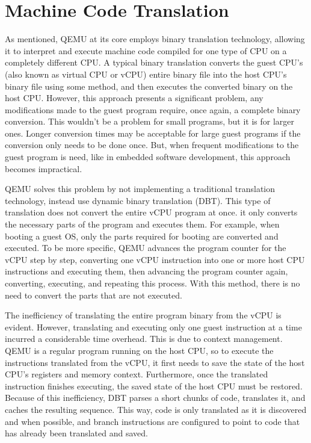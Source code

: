 \section{Machine Code Translation}
\label{chap:qemu_translation}

As mentioned, QEMU at its core employs binary translation technology, allowing 
it to interpret and execute machine code compiled for one type of CPU on a 
completely different CPU. A typical binary translation converts the guest CPU's 
(also known as virtual CPU or vCPU) entire binary file into the host CPU's binary file 
using some method, and then executes the converted binary on the host CPU. 
However, this approach presents a significant problem, any modifications made to the 
guest program require, once again, a complete binary conversion. This wouldn't be 
a problem for small programs, but it is for larger ones. Longer conversion times may 
be acceptable for large guest programs if the conversion only needs to be done once. 
But, when frequent modifications to the guest program is need, like in embedded 
software development, this approach becomes impractical.

QEMU solves this problem by not implementing a traditional translation 
technology, instead use dynamic binary translation (DBT). This type of translation 
does not convert the entire vCPU program at once. it only converts the necessary parts 
of the program and executes them. For example, when booting a guest OS, only 
the parts required for booting are converted and executed. To be more specific, 
QEMU advances the program counter for the vCPU step by step, converting one 
vCPU instruction into one or more host CPU instructions and executing them, 
then advancing the program counter again, converting, executing, and repeating 
this process. With this method, there is no need to convert the parts that are 
not executed.

The inefficiency of translating the entire program binary from the vCPU is evident. 
However, translating and executing only one guest instruction at a time 
incurred a considerable time overhead. This is due to context management. 
QEMU is a regular program running on the host CPU, so to execute the instructions 
translated from the vCPU, it first needs to save the state of the host CPU's registers and 
memory context. Furthermore, once the translated instruction finishes executing, 
the saved state of the host CPU must be restored. Because of this inefficiency, 
DBT parses a short chunks of code, translates it, and caches the resulting sequence. 
This way, code is only translated as it is discovered and when possible, and branch 
instructions are configured to point to code that has already been translated and saved.



%
